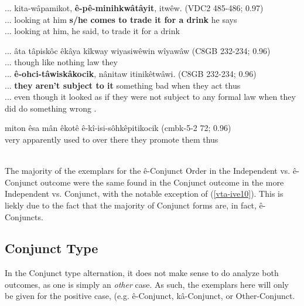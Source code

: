     \begin{exe}
    \ex 
    \gll ... kita-wâpamikot, \textbf{ê-pê-minihkwâtâyit}, itwêw. \tiny{(VDC2 485-486; 0.97)} \\
         ... {looking at him} {\textbf{s/he comes to trade it for a drink}} {he says}   \\
    \trans ... looking at him, he said, to trade it for a drink \tiny{\citep[68-69]{VandallDouquette1987}} \\
    \label{vta-ive8}
    \end{exe}

    
    \begin{exe}
    \ex 
    \gll ... âta tâpiskôc {êkâya kîkway} wiyasiwêwin wîyawâw \tiny{(C8GB 232-234; 0.96)}\\
         ... though like {nothing} law they \\
    \gll ... \textbf{ê-ohci-tâwiskâkocik}, nânitaw itinikêtwâwi. \tiny{(C8GB 232-234; 0.96)} \\
         ... {\textbf{they aren't subject to it}} {something bad} {when they act thus}  \\
    \trans ... even though it looked as if they were not subject to any formal law when they did do something wrong \tiny{\citep[50-51]{VandallDouquette1987}}. \\
    \label{vta-ive9}
    \end{exe}
    
    \begin{exe}
    \ex 
    \gll miton êsa mân êkotê ê-kî-isi-sôhkêpitikocik (cmbk-5-2 72; 0.96) \\
         very apparently {used to} {over there} {they promote them thus}   \\
    \trans  \\
    \label{vta-ive10}
    \end{exe}
    
    
The majority of the exemplars for the ê-Conjunct Order in the Independent vs. ê-Conjunct outcome were the same found in the Conjunct outcome in the more Independent vs. Conjunct, with the notable exception of (\ref{vta-ive10}). This is liekly due to the fact that the majority of Conjunct forms are, in fact, ê-Conjuncts.
    
    \subsection{Conjunct Type}
    
    In the Conjunct type alternation, it does not make sense to do analyze both outcomes, as one is simply an \textit{other} case. As such, the exemplars here will only be given for the positive case, (e.g. ê-Conjunct, kâ-Conjunct, or Other-Conjunct.
    
